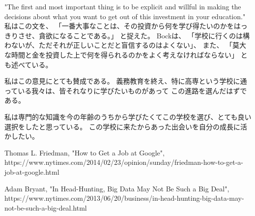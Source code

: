 \documentclass{jsarticle}
\begin{document}
    "The first and most important thing is to be explicit and willful in making the decisions about what you want to get out of this investment in your education."
    私はこの文を、
    「一番大事なことは、その投資から何を学び得たいのかをはっきりさせ、貪欲になることである。」
    と捉えた。
    Bockは、
    「学校に行くのは構わないが、ただそれが正しいことだと盲信するのはよくない」、
    また、
    「莫大な時間と金を投資した上で何を得られるのかをよく考えなければならない」
    とも述べている。

    私はこの意見にとても賛成である。
    義務教育を終え、特に高専という学校に通っている我々は、皆それなりに学びたいものがあって
    この進路を選んだはずである。

    私は専門的な知識を今の年齢のうちから学びたくてこの学校を選び、とても良い選択をしたと思っている。
    この学校に来たからあった出会いを自分の成長に活かしたい。

\begin{thebibliography}{99}
    \item Thomas L. Friedman, "How to Get a Job at Google", \\
        https://www.nytimes.com/2014/02/23/opinion/sunday/friedman-how-to-get-a-job-at-google.html
    \item Adam Bryant, "In Head-Hunting, Big Data May Not Be Such a Big Deal", \\
        https://www.nytimes.com/2013/06/20/business/in-head-hunting-big-data-may-not-be-such-a-big-deal.html
\end{thebibliography}
\end{document}
